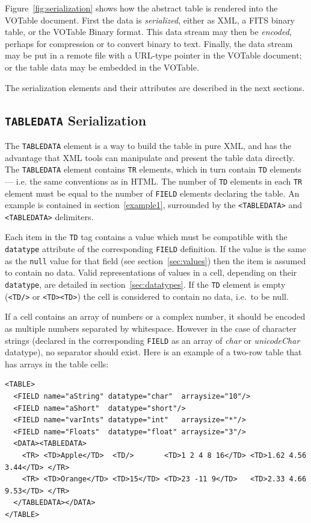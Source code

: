\documentclass[11pt,a4paper]{ivoa}
\def\Aref#1{section~\ref{#1}}
\def\Fref#1{Figure~\ref{#1}}
\let\fg=\color
\def\slash {{\fg{blue}/}}
\def\attr#1{{\tt{\fg{DarkRed}#1}}}
\def\elem#1{{\tt{\fg{DarkRed}#1}}}
\def\elemdef#1#2{{\tt\fg{blue}<}{\tt{\fg{DarkRed}#1}#2}{\tt\fg{blue}>}}
\begin{document}
\Fref{fig:serialization}
shows how the abstract table is rendered into the
VOTable document. First the data is {\it serialized}, either
as XML, a FITS binary table, or the VOTable
Binary format. This data stream may then be {\it encoded},
perhaps for compression or to convert binary to text. Finally, the
data stream may be put in a remote file with a URL-type pointer in
the VOTable document; or the table data may be embedded in the
VOTable.


The serialization elements and their attributes are
described in the next sections.

\subsection{\elem{TABLEDATA} Serialization}
\label{sec:TABLEDATA}
\label{elem:TD}
\label{elem:TR}

The \elem{TABLEDATA} element is a way to build the table in pure XML,
and has the advantage that XML tools can manipulate and present
the table data directly.
The \elem{TABLEDATA} element  contains {\elem{TR}}
elements, which in turn contain {\elem{TD}}
elements --- i.e. the same conventions as in HTML.
The number of {\elem{TD}} elements in each {\elem{TR}} element
must be equal to the number of {\elem{FIELD}} elements declaring the table.
An example is contained in \Aref{example1},
surrounded by the \elemdef{TABLEDATA}{} and \elemdef{\slash TABLEDATA}{}
delimiters.

Each item in the {\elem{TD}} tag
contains a value which must be compatible with
the {\attr{datatype}} attribute of the corresponding {\elem{FIELD}} definition.
If the value is the same as the {\attr{null}} value for that field
(see \Aref{sec:values})
then the item is assumed to contain no data.
Valid representations of values in a cell, depending on their
\attr{datatype}, are detailed in \Aref{sec:datatypes}.
If the {\elem{TD}} element is empty
(\elemdef{TD}{\slash} or \elemdef{TD}{}\elemdef{\slash TD}{})
the cell is considered to contain no data, i.e.\ to be null.

If a cell contains an array of numbers or a complex number,
it should be encoded as multiple numbers separated by
whitespace. However in the case of character strings
(declared in the corresponding \elem{FIELD} as an array of {\em char}
or {\em unicodeChar} datatype), no
separator should exist. Here is an example of a two-row table
that  has arrays in the table cells:

\begingroup\small
\label{example2}
\begin{verbatim}
<TABLE>
  <FIELD name="aString" datatype="char"  arraysize="10"/>
  <FIELD name="aShort"  datatype="short"/>
  <FIELD name="varInts" datatype="int"   arraysize="*"/>
  <FIELD name="Floats"  datatype="float" arraysize="3"/>
  <DATA><TABLEDATA>
    <TR> <TD>Apple</TD>  <TD/>       <TD>1 2 4 8 16</TD> <TD>1.62 4.56 3.44</TD> </TR>
    <TR> <TD>Orange</TD> <TD>15</TD> <TD>23 -11 9</TD>   <TD>2.33 4.66 9.53</TD> </TR>
  </TABLEDATA></DATA>
</TABLE>
\end{verbatim}
\endgroup
\end{document}
